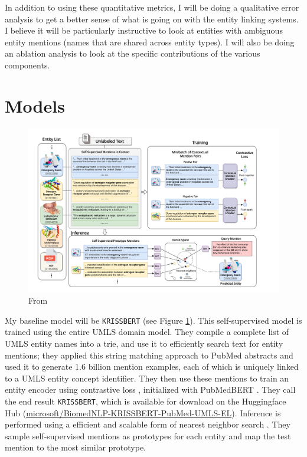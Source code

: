 \documentclass{article}
\begin{document}
In addition to using these quantitative metrics, I will be doing a qualitative error analysis to get a better sense of what is going on with the entity linking systems. I believe it will be particularly instructive to look at entities with ambiguous entity mentions (names that are shared across entity types). I will also be doing an ablation analysis to look at the specific contributions of the various components.

\section{Models}

\begin{figure}
  \includegraphics[scale=0.5]{images/KRISS-figure-1.png}
  \caption{From \cite{zhang_knowledge-rich_2022}}
  \label{fig:kriss}
\end{figure}

My baseline model will be \texttt{KRISSBERT} \cite{zhang_knowledge-rich_2022} (see Figure \ref{fig:kriss}). This self-supervised model is trained using the entire UMLS domain model. They compile a complete list of UMLS entity names into a trie, and use it to efficiently search text for entity mentions; they applied this string matching approach to PubMed abstracts and used it to generate 1.6 billion mention examples, each of which is uniquely linked to a UMLS entity concept identifier. They then use these mentions to train an entity encoder using contrastive loss \cite{oord_representation_2019}, initialized with PubMedBERT \cite{gu_domain-specific_2022}. They call the end result \texttt{KRISSBERT}, which is available for download on the Huggingface Hub (\url{microsoft/BiomedNLP-KRISSBERT-PubMed-UMLS-EL}). Inference is performed using a efficient and scalable form of nearest neighbor search \cite{johnson_billion-scale_2017}. They sample self-supervised mentions as prototypes for each entity and map the test mention to the most similar prototype.
\end{document}
